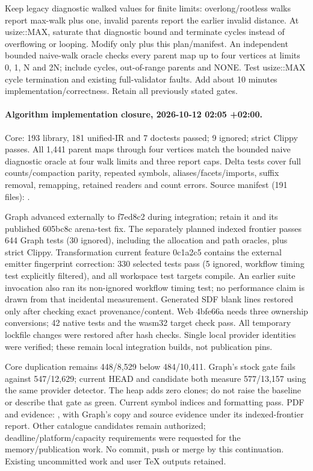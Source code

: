 \documentclass[11pt,a4paper]{article}
\begin{document}
Keep legacy diagnostic walked values for finite limits: overlong/rootless walks
report max-walk plus one, invalid parents report the earlier invalid distance.
At usize::MAX, saturate that diagnostic bound and terminate cycles instead of
overflowing or looping. Modify only  plus this plan/manifest.
An independent bounded naive-walk oracle checks every parent map up to four
vertices at limits 0, 1, N and 2N; include cycles, out-of-range parents and NONE.
Test usize::MAX cycle termination and existing full-validator faults. Add about
10 minutes implementation/correctness. Retain all previously stated gates.

\paragraph{Algorithm implementation closure, 2026-10-12 02:05 +02:00.}
Core: 193 library, 181 unified-IR and 7 doctests passed; 9 ignored; strict Clippy
passes. All 1,441 parent maps through four vertices match the bounded naive
diagnostic oracle at four walk limits and three report caps. Delta tests cover
full counts/compaction parity, repeated symbols, aliases/facets/imports, suffix
removal, remapping, retained readers and count errors. Source manifest (191 files):
.

Graph advanced externally to f7ed8c2 during integration; retain it and its
published 605bc8c arena-test fix. The separately planned indexed frontier passes
644 Graph tests (30 ignored), including the allocation and path oracles, plus
strict Clippy. Transformation current feature 0c1a2c5 contains the external emitter
fingerprint correction: 330 selected tests pass (5 ignored, workflow timing test
explicitly filtered), and all workspace test targets compile. An earlier suite
invocation also ran its non-ignored workflow timing test; no performance claim
is drawn from that incidental measurement. Generated SDF blank lines restored
only after checking exact provenance/content. Web 4bfe66a needs three ownership
conversions; 42 native tests and the wasm32 target check pass. All temporary
lockfile changes were restored after hash checks. Single local provider identities
were verified; these remain local integration builds, not publication pins.

Core duplication remains 448/8,529 below 484/10,411. Graph's stock gate fails
against 547/12,629; current HEAD and candidate both measure 577/13,157 using the
same provider detector. The heap adds zero clones; do not raise the baseline or
describe that gate as green. Current symbol indices and formatting pass.
PDF and evidence: , with
Graph's copy and source evidence under its indexed-frontier report. Other
catalogue candidates remain authorized; deadline/platform/capacity requirements
were requested for the memory/publication work. No commit, push or merge by this
continuation. Existing uncommitted work and user TeX outputs retained.
\end{document}
